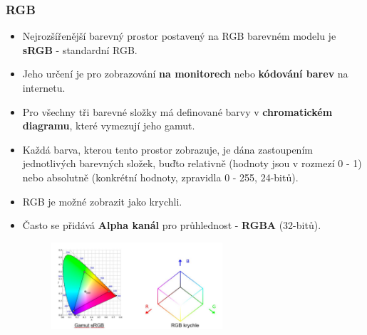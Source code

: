 \subsubsection{RGB}
\begin{itemize}
	\item Nejrozšířenější barevný prostor postavený na RGB barevném modelu je \textbf{sRGB} - standardní RGB. 
	\item Jeho určení je pro zobrazování \textbf{na monitorech} nebo \textbf{kódování barev} na internetu. 
	\item Pro všechny tři barevné složky má definované barvy v \textbf{chromatickém diagramu}, které vymezují jeho gamut. 
	\item Každá barva, kterou tento prostor zobrazuje, je dána zastoupením jednotlivých barevných složek, buďto relativně (hodnoty jsou v rozmezí 0 - 1) nebo absolutně (konkrétní  hodnoty, zpravidla 0 - 255, 24-bitů).
	\item RGB je možné zobrazit jako krychli.
	\item Často se přidává \textbf{Alpha kanál} pro průhlednost - \textbf{RGBA} (32-bitů).
	\begin{figure}[H]
	\centering
	\includegraphics[width=0.6\textwidth]{assets/1_rgb_gamut_krychle}
	\end{figure}
\end{itemize}

